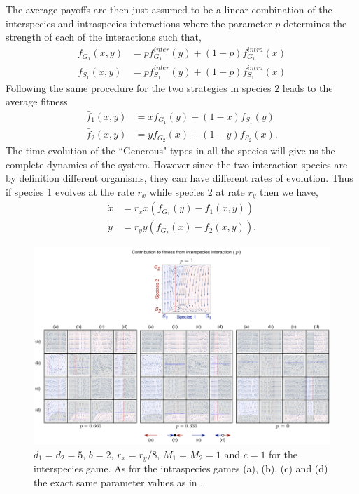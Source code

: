 \documentclass[times,onecolumn]{scrartcl}
\begin{document}
The average payoffs are then just assumed to be a linear combination of the interspecies and intraspecies interactions where the parameter $p$ determines the strength of each of the interactions such that,
%
\begin{align}
	f_{G_1} (x,y) &= p f^{inter}_{G_1} (y) + (1-p) f^{intra}_{G_1} (x) \\
	f_{S_1} (x,y) &= p f^{inter}_{S_1} (y) + (1-p) f^{intra}_{S_1} (x)
\label{fiteqs}
\end{align}
%
Following the same procedure for the two strategies in species $2$ leads to the average fitness
%
\begin{align}
\bar{f}_1 (x,y) &= x f_{G_1} (y)+(1-x) f_ {S_1}(y)\\
\bar{f}_2 (x,y) &= y f_{G_2} (x)+(1-y) f_{S_2}(x).
\label{avgfiteqs}
\end{align}
%
The time evolution of the ``Generous" types in all the species will give us the complete dynamics of the system.
However since the two interaction species are by definition different organisms, they can have different rates of evolution.
Thus if species 1 evolves at the rate $r_x$ while species 2 at rate $r_y$ then we have,
\begin{align}
\dot{x} &= r_x x \left(f_{G_1}(y) -  \bar{f}_1(x,y) \right) \nonumber \\
\dot{y} &= r_y y \left(f_{G_2}(x) -  \bar{f}_2(x,y) \right).
\label{eq:repeqs}
\end{align}


\begin{figure}[h]
\begin{center}
\includegraphics[width=\columnwidth]{../Figures/Dynamicsacrossp_reduced.pdf}
\caption{
$d_1 = d_2 = 5$, $b= 2$, $r_x = r_y/8$, $M_1 = M_2 = 1$ and $c=1$ for the interspecies game. As for the intraspecies games (a), (b), (c) and (d) the exact same parameter values as in \cite{hauert:JTB:2006a}.
}
\end{center}
\end{figure}
\end{document}
